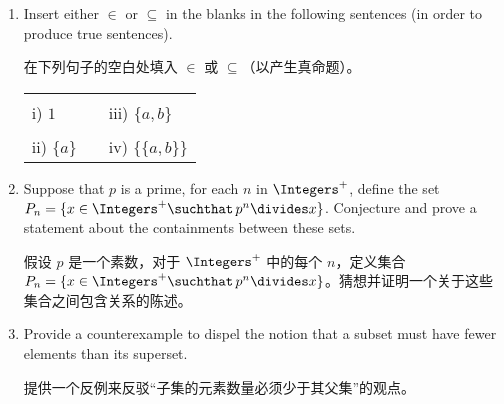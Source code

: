 \begin{enumerate}
    \item Insert either $\in$ or $\subseteq$ in the blanks in the following 
    sentences (in order to produce true sentences).
    
    在下列句子的空白处填入 $\in$ 或 $\subseteq$（以产生真命题）。
    
    \begin{tabular}{lcl}
    \rule{0pt}{16pt}i) $1$ \underline{\rule{36pt}{0pt}} $\{3, 2, 1, \{a, b\}\}$ & \rule{36pt}{0pt} & iii) $\{a, b\}$  \underline{\rule{36pt}{0pt}} $\{3, 2, 1, \{a, b\}\}$ \\
    \rule{0pt}{16pt}ii) $\{a\}$ \underline{\rule{36pt}{0pt}} $\{a, \{a, b\}\}$ & &
    iv) $\{\{a, b\}\}$  \underline{\rule{36pt}{0pt}} $\{a, \{a, b\}\}$ \\
    \end{tabular}
    
    \hint{$\in$, $\subseteq$, $\in$, $\subseteq$}
    
    \item  Suppose that $p$ is a prime, for each $n$ in $\Integers^+$, 
    define the set $P_n = \{ x \in \Integers^+ \suchthat \, p^n \divides x \}$.
    Conjecture and prove a statement about the containments between these sets.
    
    假设 $p$ 是一个素数，对于 $\Integers^+$ 中的每个 $n$，定义集合 $P_n = \{ x \in \Integers^+ \suchthat \, p^n \divides x \}$。猜想并证明一个关于这些集合之间包含关系的陈述。
    
    
    \wbvfill
    
    \item  Provide a counterexample to dispel the notion that a subset must
    have fewer elements than its superset.
    
    提供一个反例来反驳“子集的元素数量必须少于其父集”的观点。
\end{enumerate}
